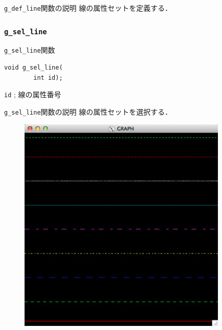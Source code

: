 \documentclass[platex,a4paper,12pt]{jsarticle}%
\begin{document}
\begin{itembox}[l]{\texttt{g\_def\_line}関数の説明}
線の属性セットを定義する．
\end{itembox}

\begin{figure}[htb]
\end{figure}



\clearpage
\subsubsection{\texttt{g\_sel\_line}}

\begin{itembox}[l]{\texttt{g\_sel\_line}関数}
\begin{verbatim}
void g_sel_line(
        int id);
\end{verbatim}
\verb|id| ; 線の属性番号
\end{itembox}

\begin{itembox}[l]{\texttt{g\_sel\_line}関数の説明}
線の属性セットを選択する．
\end{itembox}

\begin{figure}[htb]
\centering
\includegraphics[width=100mm]{./Figures/eps/Canvas_g_line.eps}
\end{figure}
\end{document}
